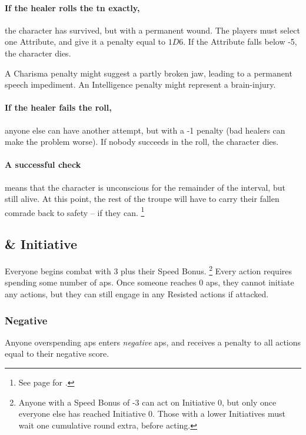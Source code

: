 \begin{multicols}{2}
\paragraph{If the healer rolls the \gls{tn} exactly,}
the character has survived, but with a permanent wound.
The players must select one Attribute, and give it a penalty equal to $1D6$.
If the Attribute falls below -5, the character dies.

A Charisma penalty might suggest a partly broken jaw, leading to a permanent speech impediment.
An Intelligence penalty might represent a brain-injury.

\paragraph{If the healer fails the roll,}
anyone else can have another attempt, but with a -1 penalty (bad healers can make the problem worse).
If nobody succeeds in the roll, the character dies.

\paragraph{A successful check}
means that the character is unconscious for the remainder of the interval, but still alive.
At this point, the rest of the troupe will have to carry their fallen comrade back to safety -- if they can.%
\footnote{See page \pageref{weight} for .}


\subsection{ \& Initiative}
\label{actionPoints}

Everyone begins combat with 3  plus their Speed Bonus.%
\footnote{Anyone with a Speed Bonus of -3 can act on Initiative 0, but only once everyone else has reached Initiative 0.
Those with a lower Initiatives must wait one cumulative round extra, before acting.}
Every action requires spending some number of \glspl{ap}.
Once someone reaches 0 \glspl{ap}, they cannot initiate any actions, but they can still engage in any Resisted actions if attacked.

\subsubsection{Negative }
Anyone overspending \glspl{ap} enters \emph{negative} \glspl{ap}, and receives a penalty to all actions equal to their negative score.


\end{multicols}
